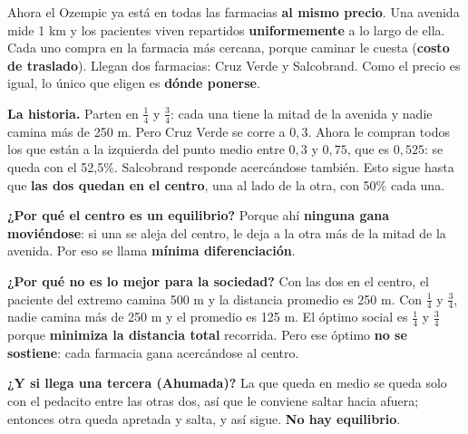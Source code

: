 \documentclass[11pt]{article}
\begin{document}
Ahora el Ozempic ya está en todas las farmacias \textbf{al mismo precio}. Una avenida mide 1 km y los pacientes viven repartidos \textbf{uniformemente} a lo largo de ella. Cada uno compra en la farmacia más cercana, porque caminar le cuesta (\textbf{costo de traslado}). Llegan dos farmacias: Cruz Verde y Salcobrand. Como el precio es igual, lo único que eligen es \textbf{dónde ponerse}.

\begin{center}
\end{center}

\textbf{La historia.} Parten en $\tfrac14$ y $\tfrac34$: cada una tiene la mitad de la avenida y nadie camina más de 250 m. Pero Cruz Verde se corre a $0{,}3$. Ahora le compran todos los que están a la izquierda del punto medio entre $0{,}3$ y $0{,}75$, que es $0{,}525$: se queda con el 52,5\%. Salcobrand responde acercándose también. Esto sigue hasta que \textbf{las dos quedan en el centro}, una al lado de la otra, con 50\% cada una.

\textbf{¿Por qué el centro es un equilibrio?} Porque ahí \textbf{ninguna gana moviéndose}: si una se aleja del centro, le deja a la otra más de la mitad de la avenida. Por eso se llama \textbf{mínima diferenciación}.

\textbf{¿Por qué no es lo mejor para la sociedad?} Con las dos en el centro, el paciente del extremo camina 500 m y la distancia promedio es 250 m. Con $\tfrac14$ y $\tfrac34$, nadie camina más de 250 m y el promedio es 125 m. El óptimo social es $\tfrac14$ y $\tfrac34$ porque \textbf{minimiza la distancia total} recorrida. Pero ese óptimo \textbf{no se sostiene}: cada farmacia gana acercándose al centro.

\textbf{¿Y si llega una tercera (Ahumada)?} La que queda en medio se queda solo con el pedacito entre las otras dos, así que le conviene saltar hacia afuera; entonces otra queda apretada y salta, y así sigue. \textbf{No hay equilibrio}.
\end{document}
